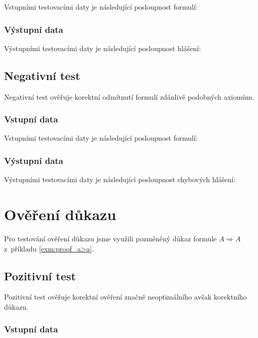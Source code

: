 \documentclass[thesis=B,czech,hidelinks]{thesis}[2012/06/26]
\begin{document}
Vstupními testovacími daty je následující posloupnost formulí:


\subsubsection{Výstupní data}

Výstupními testovacími daty je následující posloupnost hlášení:


\subsection{Negativní test}

Negativní test ověřuje korektní odmítnutí formulí zdánlivě podobných axiomům.

\subsubsection{Vstupní data}

Vstupními testovacími daty je následující posloupnost formulí:


\subsubsection{Výstupní data}

Výstupními testovacími daty je následující posloupnost chybových hlášení:


\section{Ověření důkazu}

Pro testování ověření důkazu jsme využili pozměněný důkaz formule $A \Rightarrow A$ z~příkladu \ref{exm:proof_a>a}.

\subsection{Pozitivní test}

Pozitivní test ověřuje korektní ověření značně neoptimálního avšak korektního důkazu.

\subsubsection{Vstupní data}
\end{document}
